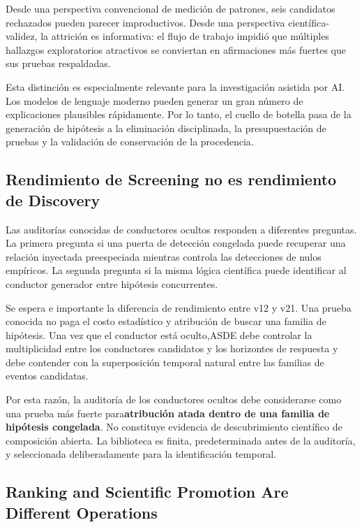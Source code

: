 \documentclass{ieeeaccess}
\begin{document}
Desde una perspectiva convencional de medición de patrones, seis candidatos rechazados pueden parecer improductivos. Desde una perspectiva científica-validez, la attrición es informativa: el flujo de trabajo impidió que múltiples hallazgos exploratorios atractivos se conviertan en afirmaciones más fuertes que sus pruebas respaldadas.

Esta distinción es especialmente relevante para la investigación asistida por AI. Los modelos de lenguaje moderno pueden generar un gran número de explicaciones plausibles rápidamente. Por lo tanto, el cuello de botella pasa de la generación de hipótesis a la eliminación disciplinada, la presupuestación de pruebas y la validación de conservación de la procedencia.

\subsection{Rendimiento de Screening no es rendimiento de Discovery}\label{rendimiento-de-screening-no-es-rendimiento-de-discovery}

Las auditorías conocidas de conductores ocultos responden a diferentes preguntas. La primera pregunta si una puerta de detección congelada puede recuperar una relación inyectada preespeciada mientras controla las detecciones de nulos empíricos. La segunda pregunta si la misma lógica científica puede identificar al conductor generador entre hipótesis concurrentes.

Se espera e importante la diferencia de rendimiento entre v12 y v21. Una prueba conocida no paga el costo estadístico y atribución de buscar una familia de hipótesis. Una vez que el conductor está oculto,ASDE debe controlar la multiplicidad entre los conductores candidatos y los horizontes de respuesta y debe contender con la superposición temporal natural entre las familias de eventos candidatas.

Por esta razón, la auditoría de los conductores ocultos debe considerarse como una prueba más fuerte para\textbf{atribución atada dentro de una familia de hipótesis congelada}. No constituye evidencia de descubrimiento científico de composición abierta. La biblioteca es finita, predeterminada antes de la auditoría, y seleccionada deliberadamente para la identificación temporal.

\subsection{Ranking and Scientific Promotion Are Different Operations}\label{ranking-and-scientific-promotion-are-different-operations}
\end{document}

